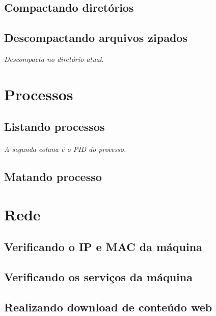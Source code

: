 \documentclass[a4paper,9pt]{extarticle}
\begin{document}
\begin{multicols}{2}
\subsection{Compactando diretórios}
	

\subsection{Descompactando arquivos zipados}
	
	 \emph{Descompacta no diretório atual.}

\section{Processos}
\subsection{Listando processos}
	
	\paragraph{} \emph{A segunda coluna é o PID do processo.} 
	
\subsection{Matando processo}
%
\section{Rede}
\subsection{Verificando o IP e MAC da máquina}

	
\subsection{Verificando os serviços da máquina}
	

\subsection{Realizando download de conteúdo web}
	 

\end{multicols}
\end{document}
